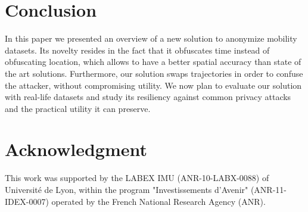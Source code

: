 \documentclass[10,conference,compsocconf]{IEEEtran}
\begin{document}
 \section{Conclusion}
\label{sec:conclusion}

In this paper we presented an overview of a new solution to anonymize mobility datasets.
Its novelty resides in the fact that it obfuscates time instead of obfuscating location, which allows to have a better spatial accuracy than state of the art solutions.
Furthermore, our solution swaps trajectories in order to confuse the attacker, without compromising utility.
We now plan to evaluate our solution with real-life datasets and study its resiliency against common privacy attacks and the practical utility it can preserve. 
\section*{Acknowledgment}
This work was supported by the LABEX IMU (ANR-10-LABX-0088) of Université de Lyon, within the program "Investissements d'Avenir" (ANR-11-IDEX-0007) operated by the French National Research Agency (ANR).



\end{document}
